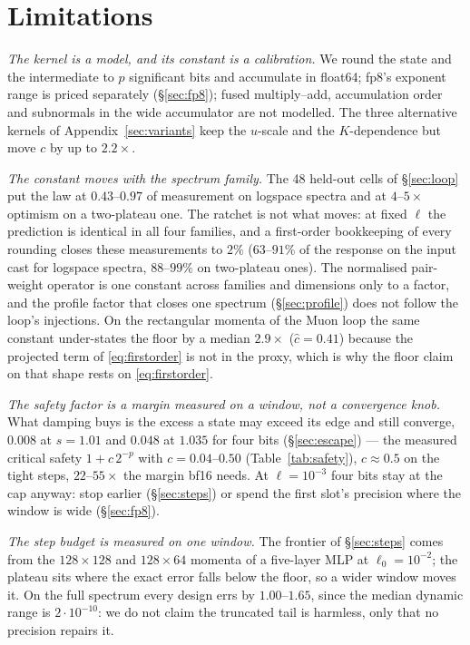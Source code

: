 \section{Limitations}
\label{sec:limitations}

\emph{The kernel is a model, and its constant is a calibration.}  We round the state and
the intermediate to $p$ significant bits and accumulate in float64; fp8's exponent range
is priced separately (\S\ref{sec:fp8}); fused multiply--add, accumulation order and
subnormals in the wide accumulator are not modelled.  The three alternative kernels of
Appendix~\ref{sec:variants} keep the $u$-scale and the $K$-dependence but move $c$ by up
to $2.2\times$.

\emph{The constant moves with the spectrum family.}  The 48 held-out cells of
\S\ref{sec:loop} put the law at $0.43$--$0.97$ of measurement on logspace spectra and at
$4$--$5\times$ optimism on a two-plateau one.  The ratchet is not what moves: at fixed $\ell$ the
prediction is identical in all four families, and a first-order bookkeeping of every
rounding closes these measurements to $2\%$ ($63$--$91\%$ of the response on the input
cast for logspace spectra, $88$--$99\%$ on two-plateau ones).  The normalised pair-weight
operator is one constant across families and dimensions only to a factor, and the profile
factor that closes one spectrum (\S\ref{sec:profile}) does not follow the loop's
injections.  On the rectangular momenta of the Muon loop the same constant under-states the floor by
a median $2.9\times$ ($\hat c=0.41$) because the projected term of \eqref{eq:firstorder} is
not in the proxy, which is why the floor claim on that shape rests on
\eqref{eq:firstorder}.

\emph{The safety factor is a margin measured on a window, not a convergence knob.}
What damping buys is the excess a state may exceed its edge and still converge, $0.008$ at
$s=1.01$ and $0.048$ at $1.035$ for four bits (\S\ref{sec:escape}) --- the measured
critical safety $1+c\,2^{-p}$ with $c=0.04$--$0.50$ (Table~\ref{tab:safety}), $c\approx0.5$
on the tight steps, $22$--$55\times$ the margin bf16 needs.  At $\ell=10^{-3}$ four bits
stay at the cap anyway: stop earlier (\S\ref{sec:steps}) or spend the first slot's
precision where the window is wide (\S\ref{sec:fp8}).

\emph{The step budget is measured on one window.}  The frontier of \S\ref{sec:steps} comes
from the $128\times128$ and $128\times64$ momenta of a five-layer MLP at
$\ell_0=10^{-2}$; the plateau sits where the exact error falls below the floor, so a wider
window moves it.  On the full spectrum every design errs by $1.00$--$1.65$, since the
median dynamic range is $2\cdot10^{-10}$: we do not claim the truncated tail is harmless,
only that no precision repairs it.

